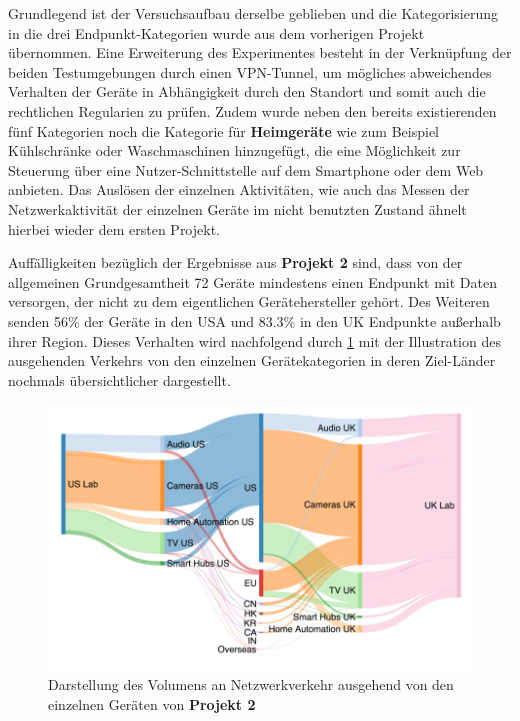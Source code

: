 \noindent Grundlegend ist der Versuchsaufbau derselbe geblieben und die Kategorisierung in die drei Endpunkt-Kategorien wurde aus dem vorherigen Projekt übernommen. Eine Erweiterung des Experimentes besteht in der Verknüpfung der beiden Testumgebungen durch einen VPN-Tunnel, um mögliches abweichendes Verhalten der Geräte in Abhängigkeit durch den Standort und somit auch die rechtlichen Regularien zu prüfen. Zudem wurde neben den bereits existierenden fünf Kategorien noch die Kategorie für \textbf{Heimgeräte} wie zum Beispiel Kühlschränke oder Waschmaschinen hinzugefügt, die eine Möglichkeit zur Steuerung über eine Nutzer-Schnittstelle auf dem Smartphone oder dem Web anbieten. Das Auslösen der einzelnen Aktivitäten, wie auch das Messen der Netzwerkaktivität der einzelnen Geräte im nicht benutzten Zustand ähnelt hierbei wieder dem ersten Projekt.

\noindent Auffälligkeiten bezüglich der Ergebnisse aus \textbf{Projekt 2} sind, dass von der allgemeinen Grundgesamtheit 72 Geräte mindestens einen Endpunkt mit Daten versorgen, der nicht zu dem eigentlichen Gerätehersteller gehört. Des Weiteren senden 56\% der Geräte in den USA und 83.3\% in den UK Endpunkte außerhalb ihrer Region. Dieses Verhalten wird nachfolgend durch \ref{fig:traffic-flow} mit der Illustration des ausgehenden Verkehrs von den einzelnen Gerätekategorien in deren Ziel-Länder nochmals übersichtlicher dargestellt.
\begin{figure}
    \centering
    \includegraphics[scale=0.3]{main/pictures/projekt_two/Traffic_Flow_Destinations}
    \caption{Darstellung des Volumens an Netzwerkverkehr ausgehend von den einzelnen Geräten von \textbf{Projekt 2} \cite{Ren2019}}
    \label{fig:traffic-flow}
\end{figure}

